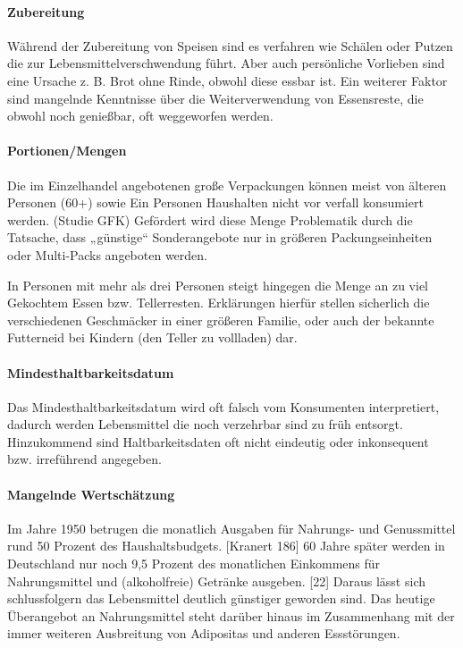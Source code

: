 \paragraph{Zubereitung}
Während der Zubereitung von Speisen sind es verfahren wie Schälen oder Putzen die zur Lebensmittelverschwendung führt. Aber auch persönliche Vorlieben sind eine Ursache z. B. Brot ohne Rinde, obwohl diese essbar ist. Ein weiterer Faktor sind mangelnde Kenntnisse über die Weiterverwendung von Essensreste, die obwohl noch genießbar, oft weggeworfen werden. %

\paragraph{Portionen/Mengen}
Die im Einzelhandel angebotenen große Verpackungen können meist von älteren Personen (60+) sowie Ein Personen Haushalten nicht vor verfall konsumiert werden. (Studie GFK) Gefördert wird diese Menge Problematik durch die Tatsache, dass „günstige“ Sonderangebote nur in größeren Packungseinheiten oder Multi-Packs angeboten werden. 

In Personen mit mehr als drei Personen steigt hingegen die Menge an zu viel Gekochtem Essen bzw. Tellerresten. Erklärungen hierfür stellen sicherlich die verschiedenen Geschmäcker in einer größeren Familie, oder auch der bekannte Futterneid bei Kindern (den Teller zu vollladen) dar. 


\paragraph{Mindesthaltbarkeitsdatum}
Das Mindesthaltbarkeitsdatum wird oft falsch vom Konsumenten interpretiert, dadurch werden Lebensmittel die noch verzehrbar sind zu früh entsorgt. Hinzukommend sind Haltbarkeitsdaten oft nicht eindeutig oder inkonsequent bzw. irreführend angegeben. %

\paragraph{Mangelnde Wertschätzung}
Im Jahre 1950 betrugen die monatlich Ausgaben für Nahrungs- und Genussmittel rund 50 Prozent des Haushaltsbudgets. [Kranert 186] 60 Jahre später werden in Deutschland nur noch 9,5 Prozent des monatlichen Einkommens für Nahrungsmittel und (alkoholfreie) Getränke ausgeben. [22] Daraus lässt sich schlussfolgern das Lebensmittel deutlich günstiger geworden sind. Das heutige Überangebot an Nahrungsmittel steht darüber hinaus im Zusammenhang mit der immer weiteren Ausbreitung von Adipositas und anderen Essstörungen. %


